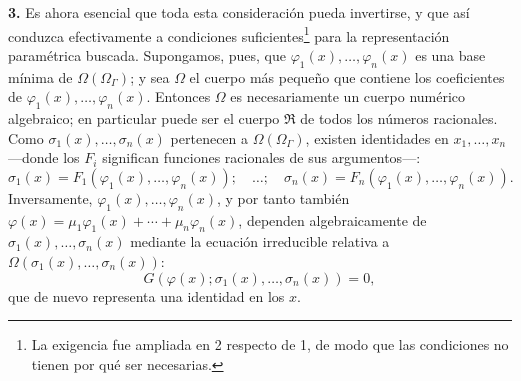 \documentclass[11pt]{article}
\begin{document}
\textbf{3.} Es ahora esencial que toda esta consideración pueda invertirse, y que así conduzca efectivamente a condiciones suficientes\footnote{La exigencia fue ampliada en 2 respecto de 1, de modo que las condiciones no tienen por qué ser necesarias.} para la representación paramétrica buscada. Supongamos, pues, que $\varphi_1(x),\ldots,\varphi_n(x)$ es una base mínima de $\Omega(\Omega_\Gamma)$; y sea $\Omega$ el cuerpo más pequeño que contiene los coeficientes de $\varphi_1(x),\ldots,\varphi_n(x)$. Entonces $\Omega$ es necesariamente un cuerpo numérico algebraico; en particular puede ser el cuerpo $\mathfrak R$ de todos los números racionales. Como $\sigma_1(x),\ldots,\sigma_n(x)$ pertenecen a $\Omega(\Omega_\Gamma)$, existen identidades en $x_1,
\ldots,x_n$ ---donde los $F_i$ significan funciones racionales de sus argumentos---:
\begin{equation}\tag{5}
\sigma_1(x)=F_1(\varphi_1(x),\ldots,\varphi_n(x));\quad\ldots;\quad
\sigma_n(x)=F_n(\varphi_1(x),\ldots,\varphi_n(x)).
\end{equation}
Inversamente, $\varphi_1(x),\ldots,\varphi_n(x)$, y por tanto también
$\varphi(x)=\mu_1\varphi_1(x)+\cdots+\mu_n\varphi_n(x)$, dependen algebraicamente de $\sigma_1(x),\ldots,\sigma_n(x)$ mediante la ecuación irreducible relativa a $\Omega(\sigma_1(x),\ldots,\sigma_n(x))$:
\begin{equation}\tag{6}
G(\varphi(x);\sigma_1(x),\ldots,\sigma_n(x))=0,
\end{equation}
que de nuevo representa una identidad en los $x$.
\end{document}
